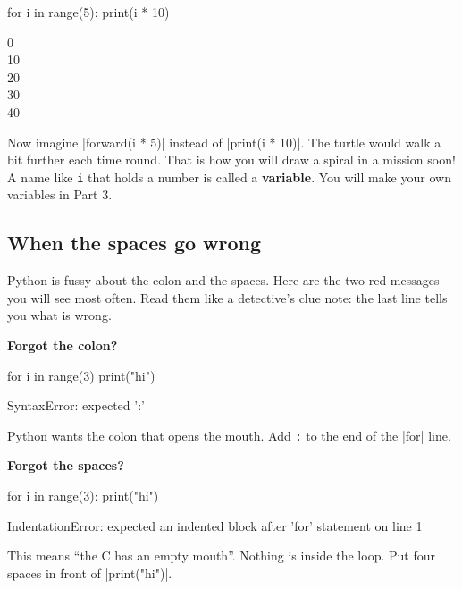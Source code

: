 \begin{tcbraster}[raster columns=2, raster equal height=rows, raster column skip=12pt, raster valign=center]
\begin{code}
for i in range(5):
    print(i * 10)
\end{code}
\begin{outputbox}
0\\
10\\
20\\
30\\
40
\end{outputbox}
\end{tcbraster}

Now imagine \py|forward(i * 5)| instead of \py|print(i * 10)|. The turtle would walk a bit further each time round. That is how you will draw a spiral in a mission soon! A name like \texttt{i} that holds a number is called a \textbf{variable}. You will make your own variables in Part 3.

\subsection*{When the spaces go wrong}

Python is fussy about the colon and the spaces. Here are the two red messages you will see most often. Read them like a detective's clue note: the last line tells you what is wrong.

\textbf{Forgot the colon?}

\begin{codenonum}
for i in range(3)
    print("hi")
\end{codenonum}
\begin{errorbox}
SyntaxError: expected ':'
\end{errorbox}

Python wants the colon that opens the mouth. Add \texttt{:} to the end of the \py|for| line.

\textbf{Forgot the spaces?}

\begin{codenonum}
for i in range(3):
print("hi")
\end{codenonum}
\begin{errorbox}
IndentationError: expected an indented block after 'for' statement on line 1
\end{errorbox}

This means ``the C has an empty mouth''. Nothing is inside the loop. Put four spaces in front of \py|print("hi")|.


